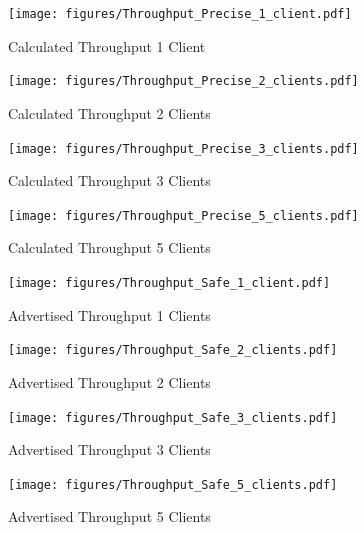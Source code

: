 \documentclass[10pt,sigconf]{acmart}
\begin{document}
\twocolumn

\begin{figure}
  \centering
  \texttt{[image: figures/Throughput\_Precise\_1\_client.pdf]}
  \caption{Calculated Throughput 1 Client}
  \label{fig:throughput-precise-clients-1-app}
\end{figure}

\begin{figure}
  \centering
  \texttt{[image: figures/Throughput\_Precise\_2\_clients.pdf]}
  \caption{Calculated Throughput 2 Clients}
  \label{fig:throughput-precise-clients-2-app}
\end{figure}

\begin{figure}
  \centering
  \texttt{[image: figures/Throughput\_Precise\_3\_clients.pdf]}
  \caption{Calculated Throughput 3 Clients}
  \label{fig:throughput-precise-clients-3-app}
\end{figure}

\begin{figure}
  \centering
  \texttt{[image: figures/Throughput\_Precise\_5\_clients.pdf]}
  \caption{Calculated Throughput 5 Clients}
  \label{fig:throughput-precise-clients-5-app}
\end{figure}

\begin{figure}
  \centering
  \texttt{[image: figures/Throughput\_Safe\_1\_client.pdf]}
  \caption{Advertised Throughput 1 Clients}
  \label{fig:throughput-safe-clients-1-app}
\end{figure}

\begin{figure}
  \centering
  \texttt{[image: figures/Throughput\_Safe\_2\_clients.pdf]}
  \caption{Advertised Throughput 2 Clients}
  \label{fig:throughput-safe-clients-2-app}
\end{figure}

\begin{figure}
  \centering
  \texttt{[image: figures/Throughput\_Safe\_3\_clients.pdf]}
  \caption{Advertised Throughput 3 Clients}
  \label{fig:throughput-safe-clients-3-app}
\end{figure}

\begin{figure}
  \centering
  \texttt{[image: figures/Throughput\_Safe\_5\_clients.pdf]}
  \caption{Advertised Throughput 5 Clients}
  \label{fig:throughput-safe-clients-5-app}
\end{figure}


\end{document}
